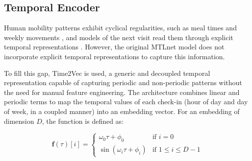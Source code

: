 \subsection{Temporal Encoder}

Human mobility patterns exhibit cyclical regularities, such as meal times and weekly movements \cite{cho2011gowalla}, and models of the next visit read them through explicit temporal representations \cite{sun2020go}. However, the original MTLnet model does not incorporate explicit temporal representations to capture this information.

To fill this gap, Time2Vec \cite{kazemi2019time2vec} is used, a generic and decoupled temporal representation capable of capturing periodic and non-periodic patterns without the need for manual feature engineering. The architecture combines linear and periodic terms to map the temporal values of each check-in (hour of day and day of week, in a coupled manner) into an embedding vector. For an embedding of dimension $D$, the function is defined as:

\begin{equation}
\mathbf{f}(\tau)[i] = \begin{cases} \omega_0 \tau + \phi_0 & \text{if } i=0 \\ \sin(\omega_i \tau + \phi_i) & \text{if } 1 \leq i \leq D-1 \end{cases}
\label{eq:courb:time2vec}
\end{equation}

